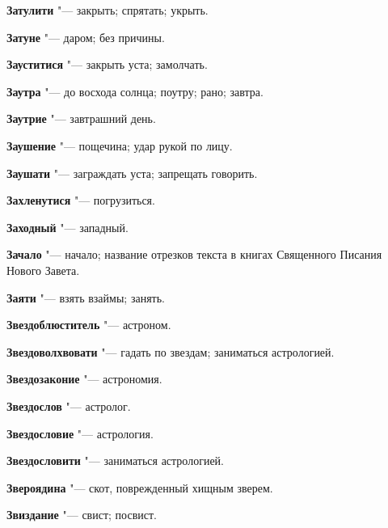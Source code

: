 \begin{mymulticols}{2}
\noindent\textbf{Затулити} "--- закрыть; спрятать; укрыть. 




\noindent\textbf{Затуне} "--- даром; без причины. 




\noindent\textbf{Зауститися} "--- закрыть уста; замолчать. 




\noindent\textbf{Заутра} "--- до восхода солнца; поутру; рано; завтра. 




\noindent\textbf{Заутрие} "--- завтрашний день. 




\noindent\textbf{Заушение} "--- пощечина; удар рукой по лицу. 




\noindent\textbf{Заушати} "--- заграждать уста; запрещать говорить. 




\noindent\textbf{Захленутися} "--- погрузиться. 




\noindent\textbf{Заходный} "--- западный. 




\noindent\textbf{Зачало} "--- начало; название отрезков текста в книгах Священного Писания Нового Завета. 




\noindent\textbf{Заяти} "--- взять взаймы; занять. 




\noindent\textbf{Звездоблюститель} "--- астроном. 




\noindent\textbf{Звездоволхвовати} "--- гадать по звездам; заниматься астрологией. 




\noindent\textbf{Звездозаконие} "--- астрономия. 




\noindent\textbf{Звездослов} "--- астролог. 




\noindent\textbf{Звездословие} "--- астрология. 




\noindent\textbf{Звездословити} "--- заниматься астрологией. 




\noindent\textbf{Звероядина} "--- скот, поврежденный хищным зверем. 




\noindent\textbf{Звиздание} "--- свист; посвист. 





\end{mymulticols}
